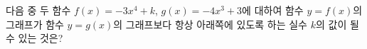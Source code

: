 다음 중 두 함수 $f(x)=-3x^4+k$, $g(x)=-4x^3+3$에 대하여 함수 $y=f(x)$의 그래프가 함수 $y=g(x)$의 그래프보다 항상 아래쪽에 있도록 하는 실수 $k$의 값이 될 수 있는 것은?
